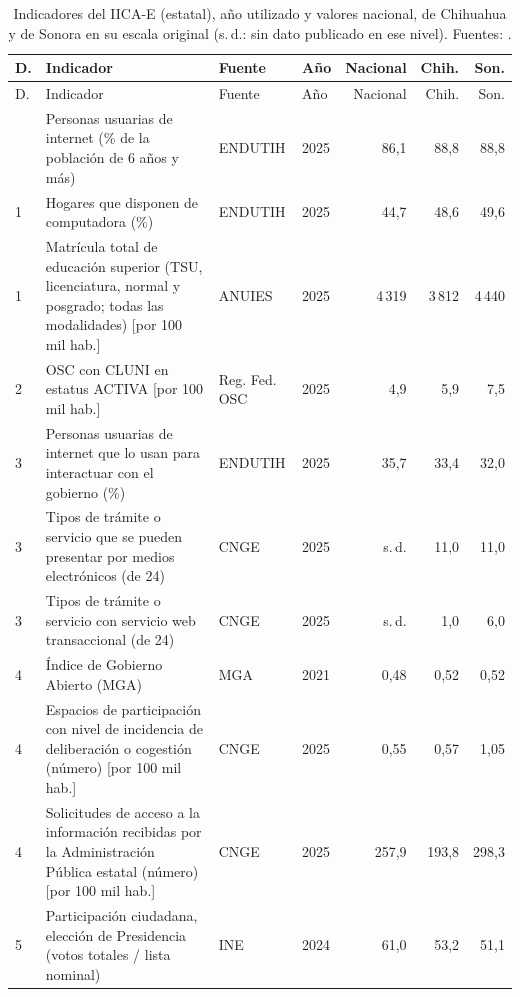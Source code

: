 {\footnotesize
\begin{longtable}{@{}p{0.4cm}>{\raggedright\arraybackslash}p{4.75cm}>{\raggedright\arraybackslash}p{1.8cm}p{0.7cm}rrr@{}}
\caption{Indicadores del IICA-E (estatal), año utilizado y valores nacional, de Chihuahua y de Sonora en su escala original (s.\,d.: sin dato publicado en ese nivel). Fuentes: \parencite{anuies_anuario_2025,bienestar_rfosc_2025,impi_cifras_2026,inai_cide_mga_2021,ine_computos_2024,inegi_cnge_2025,inegi_denue_2026,inegi_encig_2025,inegi_endutih_2025,secihti_snii_2025}.}\label{tab:ind-est}\\
\toprule
D. & Indicador & Fuente & Año & Nacional & Chih. & Son.\\
\midrule
\endfirsthead
\toprule
D. & Indicador & Fuente & Año & Nacional & Chih. & Son.\\
\midrule
\endhead
\bottomrule
\endfoot
1 & Personas usuarias de internet (\% de la población de 6 años y más) & ENDUTIH & 2025 & 86{,}1 & 88{,}8 & 88{,}8\\
1 & Hogares que disponen de computadora (\%) & ENDUTIH & 2025 & 44{,}7 & 48{,}6 & 49{,}6\\
1 & Matrícula total de educación superior (TSU, licenciatura, normal y posgrado; todas las modalidades) [por 100 mil hab.] & ANUIES & 2025 & 4\,319 & 3\,812 & 4\,440\\
2 & OSC con CLUNI en estatus ACTIVA [por 100 mil hab.] & Reg. Fed. OSC & 2025 & 4{,}9 & 5{,}9 & 7{,}5\\
3 & Personas usuarias de internet que lo usan para interactuar con el gobierno (\%) & ENDUTIH & 2025 & 35{,}7 & 33{,}4 & 32{,}0\\
3 & Tipos de trámite o servicio que se pueden presentar por medios electrónicos (de 24) & CNGE & 2025 & s.\,d. & 11{,}0 & 11{,}0\\
3 & Tipos de trámite o servicio con servicio web transaccional (de 24) & CNGE & 2025 & s.\,d. & 1{,}0 & 6{,}0\\
4 & Índice de Gobierno Abierto (MGA) & MGA & 2021 & 0{,}48 & 0{,}52 & 0{,}52\\
4 & Espacios de participación con nivel de incidencia de deliberación o cogestión (número) [por 100 mil hab.] & CNGE & 2025 & 0{,}55 & 0{,}57 & 1{,}05\\
4 & Solicitudes de acceso a la información recibidas por la Administración Pública estatal (número) [por 100 mil hab.] & CNGE & 2025 & 257{,}9 & 193{,}8 & 298{,}3\\
5 & Participación ciudadana, elección de Presidencia (votos totales / lista nominal) & INE & 2024 & 61{,}0 & 53{,}2 & 51{,}1\\

\end{longtable}}
